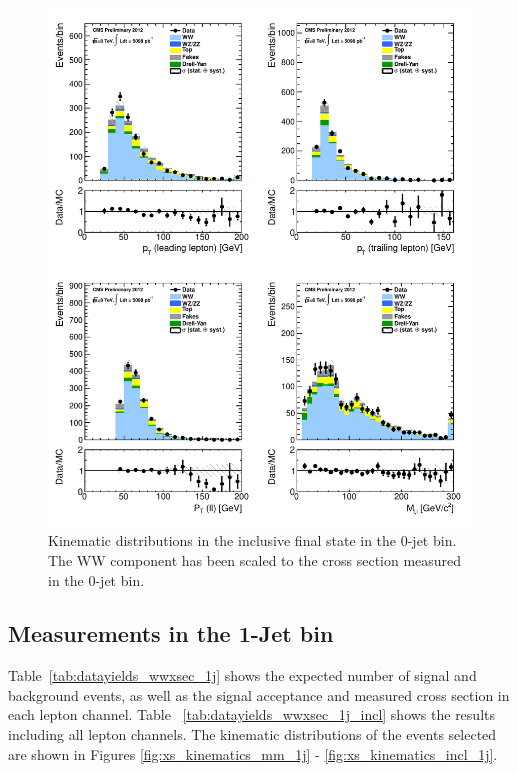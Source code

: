 \begin{figure}[!hbtp]
\centering
\includegraphics[width=1\textwidth]{figures/ww_analysis20_0_ALL_incl_0j.pdf} %
\caption{Kinematic distributions in the inclusive final state in the 0-jet bin.
The WW component has been scaled to the cross section measured in the 0-jet bin.}
\label{fig:xs_kinematics_incl_0j}
\end{figure}

\clearpage
\subsection{Measurements in the 1-Jet bin}

Table~\ref{tab:datayields_wwxsec_1j} shows the expected number of signal and background events,
as well as the signal acceptance and measured cross section in each lepton channel.
Table ~\ref{tab:datayields_wwxsec_1j_incl} shows the results including all lepton channels.
The kinematic distributions of the events selected are shown in Figures \ref{fig:xs_kinematics_mm_1j} - \ref{fig:xs_kinematics_incl_1j}.


